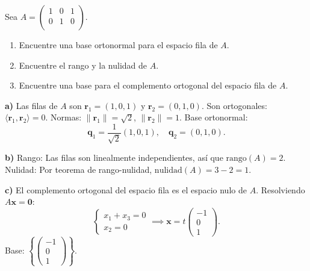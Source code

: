 \begin{prob}
Sea $A=\left( \begin{array}{ccc} 
	1&0&1\\
	0&1&0\\
	\end{array} \right).$ 
	
	\begin{enumerate} 
	\item Encuentre una base ortonormal para el espacio fila de $A.$
	\item Encuentre el rango y la nulidad de $A.$
    \item Encuentre una base para el complemento ortogonal del espacio fila de $A.$
	\end{enumerate}	
\begin{myproof}
\textbf{a)} Las filas de \( A \) son \( \mathbf{r}_1 = (1,0,1) \) y \( \mathbf{r}_2 = (0,1,0) \).  
Son ortogonales: \( \langle \mathbf{r}_1, \mathbf{r}_2 \rangle = 0 \).  
Normas: \( \|\mathbf{r}_1\| = \sqrt{2} \), \( \|\mathbf{r}_2\| = 1 \).  
Base ortonormal:  
\[
\mathbf{q}_1 = \frac{1}{\sqrt{2}} (1, 0, 1), \quad \mathbf{q}_2 = (0, 1, 0).
\]

\textbf{b)}  
Rango: Las filas son linealmente independientes, así que \( \text{rango}(A) = 2 \).  
Nulidad: Por teorema de rango-nulidad, \( \text{nulidad}(A) = 3 - 2 = 1 \).

\textbf{c)} El complemento ortogonal del espacio fila es el espacio nulo de \( A \). Resolviendo \( A\mathbf{x} = \mathbf{0} \):  
\[
\begin{cases}
x_1 + x_3 = 0 \\
x_2 = 0
\end{cases} \implies \mathbf{x} = t \begin{pmatrix} -1 \\ 0 \\ 1 \end{pmatrix}.
\]
Base: \( \boxed{\left\{ \begin{pmatrix} -1 \\ 0 \\ 1 \end{pmatrix} \right\}} \).
\end{myproof}
\end{prob}

